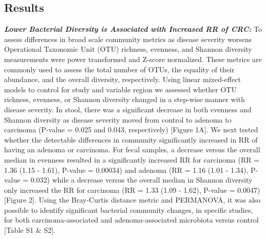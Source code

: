 \documentclass[12pt,]{article}
\begin{document}
\newpage

\subsection{Results}\label{results}

\textbf{\emph{Lower Bacterial Diversity is Associated with Increased RR
of CRC:}} To assess differences in broad scale community metrics as
disease severity worsens Operational Taxonomic Unit (OTU) richness,
evenness, and Shannon diversity measurements were power transformed and
Z-score normalized. These metrics are commonly used to assess the total
number of OTUs, the equality of their abundance, and the overall
diversity, respectively. Using linear mixed-effect models to control for
study and variable region we assessed whether OTU richness, evenness, or
Shannon diversity changed in a step-wise manner with disease severity.
In stool, there was a significant decrease in both evenness and Shannon
diversity as disease severity moved from control to adenoma to carcinoma
(P-value = 0.025 and 0.043, respectively) {[}Figure 1A{]}. We next
tested whether the detectable differences in community significantly
increased in RR of having an adenoma or carcinoma. For fecal samples, a
decrease versus the overall median in evenness resulted in a
significantly increased RR for carcinoma (RR = 1.36 (1.15 - 1.61),
P-value = 0.00034) and adenoma (RR = 1.16 (1.01 - 1.34), P-value =
0.032) while a decrease versus the overall median in Shannon diversity
only increased the RR for carcinoma (RR = 1.33 (1.09 - 1.62), P-value =
0.0047) {[}Figure 2{]}. Using the Bray-Curtis distance metric and
PERMANOVA, it was also possible to identify significant bacterial
community changes, in specific studies, for both carcinoma-associated
and adenoma-associated microbiota versus control {[}Table S1 \& S2{]}.
\end{document}
